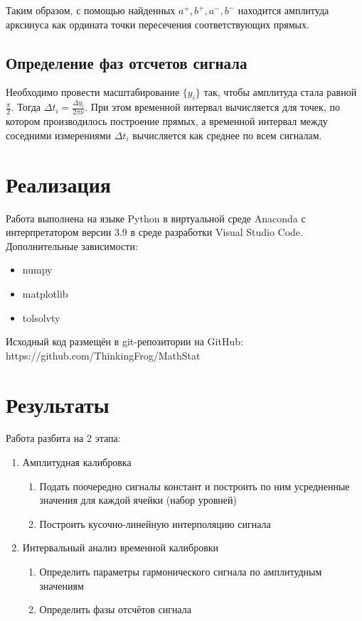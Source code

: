 \documentclass[12pt,a4paper]{article}
\begin{document}
Таким образом, с помощью найденных $a^+,b^+,a^-,b^-$ находится амплитуда арксинуса как ордината точки пересечения соответствующих прямых.

\subsection{Определение фаз отсчетов сигнала}
Необходимо провести масштабирование $\{y_i\}$ так, чтобы амплитуда стала равной $\frac{\pi}{2}$. Тогда $\Delta{t_i}=\frac{\Delta{y_i}}{2\pi\nu}$. При этом временной интервал вычисляется для точек, по котором производилось построение прямых, а временной интервал между соседними измерениями $\Delta{t_i}$ вычисляется как среднее по всем сигналам.

\section{Реализация}
Работа выполнена на языке Python в виртуальной среде Anaconda с интерпретатором версии 3.9 в среде разработки Visual Studio Code. Дополнительные зависимости:
\begin{itemize}
    \item numpy
    \item matplotlib
    \item tolsolvty
\end{itemize}

Исходный код размещён в git-репозитории на GitHub: \\ https://github.com/ThinkingFrog/MathStat

\section{Результаты}
Работа разбита на 2 этапа:
\begin{enumerate}
    \item Амплитудная калибровка
    \begin{enumerate}
        \item Подать поочередно сигналы констант и построить по ним усредненные значения для каждой ячейки (набор уровней)
        \item Построить кусочно-линейную интерполяцию сигнала
    \end{enumerate}
    \item Интервальный анализ временной калибровки
    \begin{enumerate}
        \item Определить параметры гармонического сигнала по амплитудным значениям
        \item Определить фазы отсчётов сигнала
    \end{enumerate}
\end{enumerate}
\end{document}
